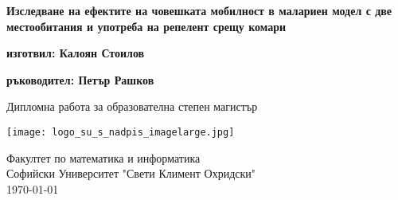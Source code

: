 \begin{titlepage}
  \begin{center}
    \vspace*{1cm}

    \Huge
    \textbf{Изследване на ефектите на човешката мобилност в малариен модел с две местообитания и употреба на репелент срещу комари}


    \vspace{1.5cm}

    \textbf{изготвил: Калоян Стоилов}

    \vspace{0.8cm}

    \textbf{ръководител: Петър Рашков}

    \vfill

    Дипломна работа за образователна степен магистър

    \vspace{0.8cm}

    \texttt{[image: logo\_su\_s\_nadpis\_imagelarge.jpg]}

    \Large
    Факултет по математика и информатика\\
    Софийски Университет "Свети Климент Охридски"\\
    \today

  \end{center}
\end{titlepage}
